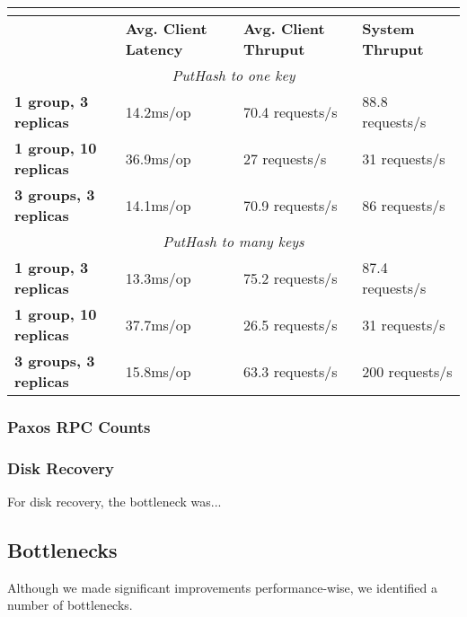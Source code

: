 \documentclass[letterpaper,10pt]{article}
\begin{document}
\begin{table}[h]
\begin{tabular}{|l|l|l|l|}
\hline
\multicolumn{4}{|c|}{\cellcolor[HTML]{C0C0C0}{\color[HTML]{000000} \textbf{Multipaxos}}}                              \\ \hline
                              & \textbf{Avg. Client Latency} & \textbf{Avg. Client Thruput} & \textbf{System Thruput} \\ \hline
\multicolumn{4}{|c|}{\textit{PutHash to one key}}                                                                     \\ \hline
\textbf{1 group, 3 replicas}  & 14.2ms/op                    & 70.4 requests/s              & 88.8 requests/s         \\ \hline
\textbf{1 group, 10 replicas} & 36.9ms/op                    & 27 requests/s                & 31 requests/s           \\ \hline
\textbf{3 groups, 3 replicas} & 14.1ms/op                    & 70.9 requests/s              & 86 requests/s           \\ \hline
\multicolumn{4}{|c|}{\textit{PutHash to many keys}}                                                                   \\ \hline
\textbf{1 group, 3 replicas}  & 13.3ms/op                    & 75.2 requests/s              & 87.4 requests/s         \\ \hline
\textbf{1 group, 10 replicas} & 37.7ms/op                    & 26.5 requests/s              & 31 requests/s           \\ \hline
\textbf{3 groups, 3 replicas} & 15.8ms/op                    & 63.3 requests/s              & 200 requests/s          \\ \hline
\end{tabular}
\end{table}

\subsubsection{Paxos RPC Counts}

\subsubsection{Disk Recovery}
For disk recovery, the bottleneck was...

\subsection{Bottlenecks}
Although we made significant improvements performance-wise, we
identified a number of bottlenecks.
\end{document}
